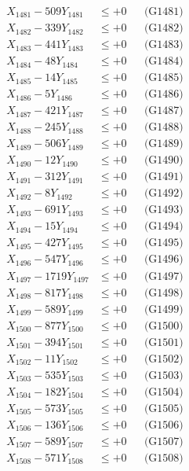 \documentclass[a4paper,10pt]{article}
\begin{document}
{\begin{align}
\allowbreak
X_{1481} - 509Y_{1481} &\leq +0 && \text{(G1481)} \\
X_{1482} - 339Y_{1482} &\leq +0 && \text{(G1482)} \\
X_{1483} - 441Y_{1483} &\leq +0 && \text{(G1483)} \\
X_{1484} - 48Y_{1484} &\leq +0 && \text{(G1484)} \\
X_{1485} - 14Y_{1485} &\leq +0 && \text{(G1485)} \\
X_{1486} - 5Y_{1486} &\leq +0 && \text{(G1486)} \\
X_{1487} - 421Y_{1487} &\leq +0 && \text{(G1487)} \\
X_{1488} - 245Y_{1488} &\leq +0 && \text{(G1488)} \\
X_{1489} - 506Y_{1489} &\leq +0 && \text{(G1489)} \\
X_{1490} - 12Y_{1490} &\leq +0 && \text{(G1490)} \\
\allowbreak
X_{1491} - 312Y_{1491} &\leq +0 && \text{(G1491)} \\
X_{1492} - 8Y_{1492} &\leq +0 && \text{(G1492)} \\
X_{1493} - 691Y_{1493} &\leq +0 && \text{(G1493)} \\
X_{1494} - 15Y_{1494} &\leq +0 && \text{(G1494)} \\
X_{1495} - 427Y_{1495} &\leq +0 && \text{(G1495)} \\
X_{1496} - 547Y_{1496} &\leq +0 && \text{(G1496)} \\
X_{1497} - 1719Y_{1497} &\leq +0 && \text{(G1497)} \\
X_{1498} - 817Y_{1498} &\leq +0 && \text{(G1498)} \\
X_{1499} - 589Y_{1499} &\leq +0 && \text{(G1499)} \\
X_{1500} - 877Y_{1500} &\leq +0 && \text{(G1500)} \\
\allowbreak
X_{1501} - 394Y_{1501} &\leq +0 && \text{(G1501)} \\
X_{1502} - 11Y_{1502} &\leq +0 && \text{(G1502)} \\
X_{1503} - 535Y_{1503} &\leq +0 && \text{(G1503)} \\
X_{1504} - 182Y_{1504} &\leq +0 && \text{(G1504)} \\
X_{1505} - 573Y_{1505} &\leq +0 && \text{(G1505)} \\
X_{1506} - 136Y_{1506} &\leq +0 && \text{(G1506)} \\
X_{1507} - 589Y_{1507} &\leq +0 && \text{(G1507)} \\
X_{1508} - 571Y_{1508} &\leq +0 && \text{(G1508)} \\

\end{align}}
\end{document}
